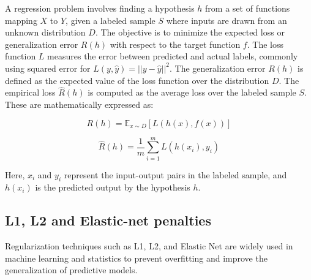 \documentclass[a4paper,10pt,twocolumn]{article}
\begin{document}
A regression problem involves finding a hypothesis $h$ from a set of functions mapping $X$ to $Y$, given a labeled sample $S$ where inputs are drawn from an unknown distribution $D$. The objective is to minimize the expected loss or generalization error $R(h)$ with respect to the target function $f$. The loss function $L$ measures the error between predicted and actual labels, commonly using squared error for $L(y, \hat{y}) = ||y - \hat{y}||^2$. The generalization error $R(h)$ is defined as the expected value of the loss function over the distribution $D$. The empirical loss $\hat{R}(h)$ is computed as the average loss over the labeled sample $S$. These are mathematically expressed as:

\begin{equation}
R(h) = \mathbb{E}_{x \sim D}[L(h(x), f(x))] \label{eq:generalization_error}
\end{equation}

\begin{equation}
\hat{R}(h) = \frac{1}{m} \sum_{i=1}^{m} L(h(x_i), y_i) \label{eq:empirical_loss}
\end{equation}

Here, $x_i$ and $y_i$ represent the input-output pairs in the labeled sample, and $h(x_i)$ is the predicted output by the hypothesis $h$. \cite{27578920080101}

\subsection{L1, L2 and Elastic-net penalties}
Regularization techniques such as L1, L2, and Elastic Net are widely used in machine learning and statistics to prevent overfitting and improve the generalization of predictive models.
\end{document}
